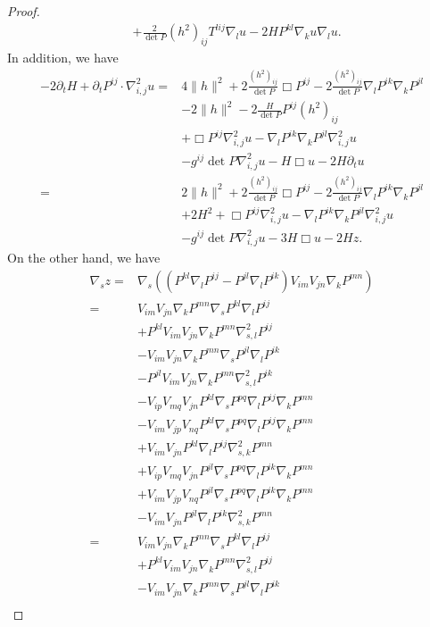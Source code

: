 \documentclass{amsart}
\theoremstyle{definition}
\theoremstyle{remark}
\numberwithin{equation}{section}
\begin{document}
\begin{proof}
\begin{align*}
&+\frac{2}{\det P}(h^2)_{ij}T^{lij}\nabla_lu-2HP^{kl}\nabla_ku\nabla_lu.
\end{align*}
In addition, we have
\begin{align*}
-2\partial_tH+\partial_tP^{ij}\cdot\nabla^2_{i,j}u=&4\|h\|^2+2\frac{(h^2)_{ij}}{\det P}\Box P^{ij}-2\frac{(h^2)_{ij}}{\det P}\nabla_lP^{ik}\nabla_kP^{jl}\\
&-2\|h\|^2-2\frac{H}{\det P}P^{ij}(h^2)_{ij}\\
&+\Box P^{ij}\nabla^2_{i,j}u-\nabla_lP^{ik}\nabla_kP^{jl}\nabla^2_{i,j}u\\
&-g^{ij}\det P\nabla^2_{i,j}u-H\Box u-2H\partial_tu\\
=&2\|h\|^2+2\frac{(h^2)_{ij}}{\det P}\Box P^{ij}-2\frac{(h^2)_{ij}}{\det P}\nabla_lP^{ik}\nabla_kP^{jl}\\
&+2H^2+\Box P^{ij}\nabla^2_{i,j}u-\nabla_lP^{ik}\nabla_kP^{jl}\nabla^2_{i,j}u\\
&-g^{ij}\det P\nabla^2_{i,j}u-3H\Box u-2Hz.
\end{align*}
On the other hand, we have
\begin{align*}
\nabla_s z=&\nabla_s\left(\left(P^{kl}\nabla_l P^{ij}-P^{jl}\nabla_lP^{ik}\right)V_{im}V_{jn}\nabla_kP^{mn}\right)\\
=&V_{im}V_{jn}\nabla_kP^{mn}\nabla_s P^{kl}\nabla_l P^{ij}\\
&+P^{kl}V_{im}V_{jn}\nabla_kP^{mn}\nabla^2_{s,l} P^{ij}\\
&-V_{im}V_{jn}\nabla_kP^{mn}\nabla_sP^{jl}\nabla_lP^{ik}\\
&-P^{jl}V_{im}V_{jn}\nabla_kP^{mn}\nabla^2_{s,l}P^{ik}\\
&-V_{ip}V_{mq}V_{jn}P^{kl}\nabla_sP^{pq}\nabla_l P^{ij}\nabla_kP^{mn}\\
&-V_{im}V_{jp}V_{nq}P^{kl}\nabla_sP^{pq}\nabla_l P^{ij}\nabla_kP^{mn}\\
&+V_{im}V_{jn}P^{kl}\nabla_l P^{ij}\nabla^2_{s,k}P^{mn}\\
&+V_{ip}V_{mq}V_{jn}P^{jl}\nabla_sP^{pq}\nabla_lP^{ik}\nabla_kP^{mn}\\
&+V_{im}V_{jp}V_{nq}P^{jl}\nabla_sP^{pq}\nabla_lP^{ik}\nabla_kP^{mn}\\
&-V_{im}V_{jn}P^{jl}\nabla_lP^{ik}\nabla^2_{s,k}P^{mn}\\
=&V_{im}V_{jn}\nabla_kP^{mn}\nabla_s P^{kl}\nabla_l P^{ij}\\
&+P^{kl}V_{im}V_{jn}\nabla_kP^{mn}\nabla^2_{s,l} P^{ij}\\
&-V_{im}V_{jn}\nabla_kP^{mn}\nabla_sP^{jl}\nabla_lP^{ik}\\

\end{align*}
\end{proof}
\end{document}
